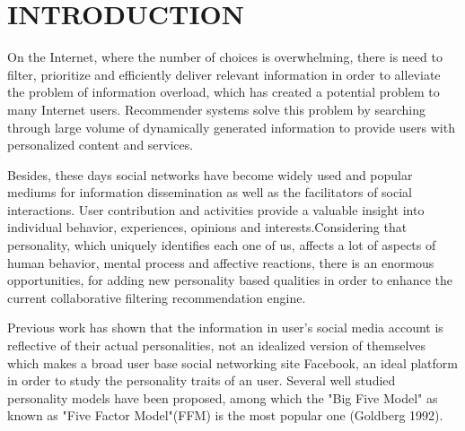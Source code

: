 \newpage
{}
\section{INTRODUCTION}
On the Internet, where the number of choices is overwhelming, there is need to filter, prioritize and efficiently deliver relevant information in order to alleviate the problem of information overload, which has created a potential problem to many Internet users. Recommender systems solve this problem by searching through large volume of dynamically generated information to provide users with personalized content and services. 

Besides, these days social networks have become widely used and popular mediums for information dissemination as well as the facilitators of social interactions. User contribution and activities provide a valuable insight into individual behavior, experiences, opinions and interests.Considering that personality, which uniquely identifies each one of us, affects a lot of aspects of human behavior, mental process and affective reactions, there is an enormous opportunities, for adding new personality based qualities in order to enhance the current collaborative filtering recommendation engine.

Previous work has shown that the information in user's social media account is reflective of their actual personalities, not an idealized version of themselves which makes a broad user base social networking site Facebook, an ideal platform in order to study the personality traits of an user. Several well studied personality models have been proposed, among which the "Big Five Model" as known as "Five Factor Model"(FFM) is the most popular one (Goldberg 1992)\cite{fivefactormodel}.

